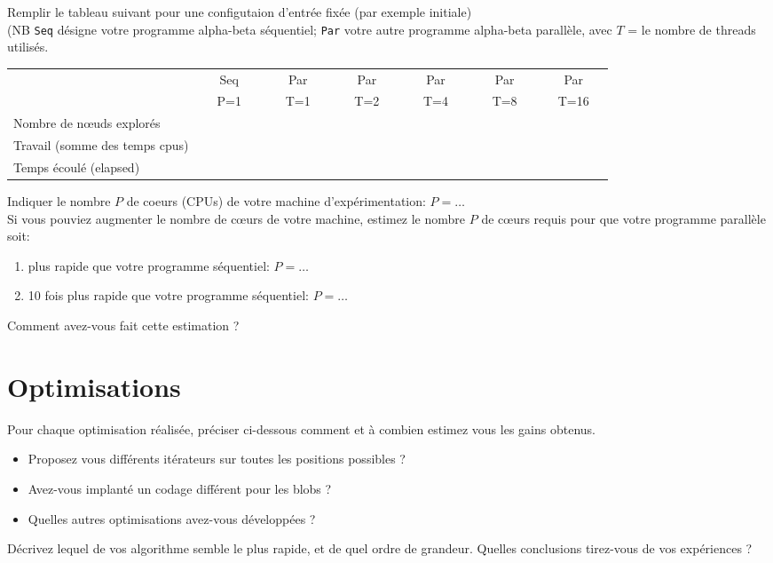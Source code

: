 \documentclass[a4paper, 11pt]{article}
\begin{document}
Remplir le tableau suivant pour une  configutaion d'entrée fixée (par exemple initiale)  \\
(NB {\tt Seq} désigne votre programme alpha-beta séquentiel; {\tt Par} votre autre programme alpha-beta parallèle,
avec $T$ = le nombre de threads utilisés. 

\begin{center}
\begin{tabular}{|l||c|c|c|c|c|c||}
\hline
                          & ~~~Seq~~~ & ~~~Par~~~ & ~~~Par~~~ & ~~~Par~~~ & ~~~Par~~~ & ~~~Par~~~   \\
                          & P=1 & T=1  & T=2 & T=4 & T=8 & T=16  \\
\hline
Nombre de n{\oe}uds explorés      & & & & & &  \\
\hline
Travail (somme des temps cpus) & & & & & &  \\
\hline
Temps écoulé (elapsed)         & & & & & & \\
\hline
\end{tabular} 
\end{center}
Indiquer le nombre $P$  de coeurs (CPUs) de votre machine d'expérimentation: $P = \ldots$ \\
Si vous pouviez augmenter le nombre de c{\oe}urs de votre machine, estimez le nombre $P$ de  c{\oe}urs requis pour que votre programme parallèle soit:
\begin{enumerate}
\item plus rapide que votre programme séquentiel: $P=\ldots $
\item 10 fois plus rapide que votre programme séquentiel: $P=\ldots $
\end{enumerate}
Comment avez-vous fait cette estimation ? %

\vspace*{3cm}

\newpage
\section{Optimisations}
Pour chaque optimisation réalisée, préciser ci-dessous comment et à combien estimez vous les
gains obtenus.
\begin{itemize}
\item Proposez vous différents itérateurs sur toutes les positions possibles ?
\vspace{1cm}
\item Avez-vous implanté un codage différent pour les blobs ?
\vspace{1cm}
\item Quelles autres optimisations avez-vous développées ?
\end{itemize}
\vspace{2cm}
Décrivez lequel de vos algorithme semble le plus rapide, et de quel ordre de grandeur.
Quelles conclusions tirez-vous de vos expériences ?
\vspace{2cm}
\end{document}
